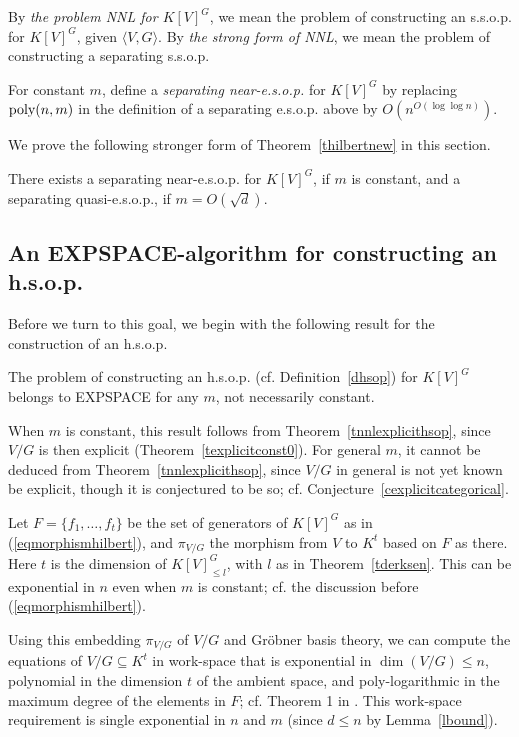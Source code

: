 \documentclass[11pt]{article}
\begin{document}
By {\em the problem NNL for $K[V]^G$}, we mean  the problem of constructing an s.s.o.p. for $K[V]^G$, given $\langle V, G\rangle$.
By {\em the strong form of NNL}, we mean the problem of constructing a
separating s.s.o.p.

For constant $m$,  define a {\em separating near-e.s.o.p.} 
for $K[V]^G$ by replacing ${\mbox {poly}}(n,m)$ in the definition of a separating e.s.o.p. above
by $O(n^{O(\log \log n)})$. 

We prove the following stronger form of Theorem~\ref{thilbertnew} in this section.

\begin{theorem} \label{thilbertmainlower}
There exists 
a separating near-e.s.o.p. for $K[V]^G$, if $m$ is constant, and a separating quasi-e.s.o.p., if $m=O(\sqrt{d})$.
\end{theorem}


\subsection{An EXPSPACE-algorithm for constructing an h.s.o.p.} \label{sexpspacehsop}
Before  we turn to this goal, we begin with the following result for the construction of an h.s.o.p.

\begin{prop} \label{pfftandsfthilbert}
The problem of constructing an h.s.o.p. (cf. Definition~\ref{dhsop})
for  $K[V]^G$ belongs to EXPSPACE for any $m$, not necessarily constant.
\end{prop}

When $m$ is constant, this result follows from Theorem~\ref{tnnlexplicithsop}, 
since $V/G$ is then explicit (Theorem~\ref{texplicitconst0}).
For general $m$, it cannot be deduced from Theorem~\ref{tnnlexplicithsop}, since $V/G$ in general is not yet known be explicit,
though it is conjectured to be so; cf. Conjecture~\ref{cexplicitcategorical}. 


\proof
Let $F=\{f_1,\ldots,f_t\}$ be the set of generators of $K[V]^G$ as in (\ref{eqmorphismhilbert}), and 
$\pi_{V/G}$  the morphism from $V$ to $K^t$ based on $F$ as there. Here $t$  is  the dimension of 
$K[V]^G_{\le l}$, with $l$ as in Theorem~\ref{tderksen}. This can be exponential in $n$ even when $m$ is 
constant; cf. the discussion before (\ref{eqmorphismhilbert}).

Using this embedding $\pi_{V/G}$  of $V/G$ and Gr\"obner basis theory,
we can compute the equations of $V/G \subseteq K^t$ 
in work-space that is exponential in $\dim(V/G) \le n$, polynomial in the dimension $t$ of the
ambient space, and poly-logarithmic in the maximum degree of the elements in $F$; cf. Theorem 1 in \cite{mayr2}. 
This work-space requirement is  single exponential in $n$ and $m$ (since $d \le n$
by Lemma~\ref{lbound}). 
\end{document}
